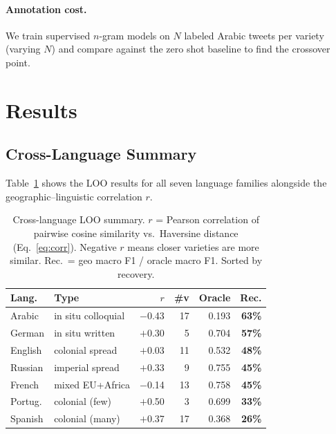 \documentclass[11pt]{article}
\begin{document}
\paragraph{Annotation cost.}
We train supervised $n$-gram models on $N$ labeled Arabic tweets per variety (varying $N$) and compare against the zero shot baseline to find the crossover point.

\section{Results}
\label{sec:results}

\subsection{Cross-Language Summary}
\label{sec:summary}

Table~\ref{tab:summary} shows the LOO results for all seven language families alongside the geographic--linguistic correlation $r$.

\begin{table}[t]
\centering
\footnotesize
\setlength{\tabcolsep}{3pt}
\begin{tabular}{l p{2.1cm} r r r r}
\toprule
\textbf{Lang.} & \textbf{Type} & $r$ &
  \textbf{\#v} & \textbf{Oracle} & \textbf{Rec.} \\
\midrule
Arabic    & in situ colloquial  & $-$0.43 & 17 & 0.193 & \textbf{63\%} \\
German    & in situ written     & $+$0.30 &  5 & 0.704 & \textbf{57\%} \\
English   & colonial spread     & $+$0.03 & 11 & 0.532 & \textbf{48\%} \\
Russian   & imperial spread     & $+$0.33 &  9 & 0.755 & \textbf{45\%} \\
French    & mixed EU+Africa     & $-$0.14 & 13 & 0.758 & \textbf{45\%} \\
Portug.   & colonial (few)      & $+$0.50 &  3 & 0.699 & \textbf{33\%} \\
Spanish   & colonial (many)     & $+$0.37 & 17 & 0.368 & \textbf{26\%} \\
\bottomrule
\end{tabular}
\caption{Cross-language LOO summary.
  $r$ = Pearson correlation of pairwise cosine similarity vs.\ Haversine distance (Eq.~\ref{eq:corr}).
  Negative $r$ means closer varieties are more similar.
  Rec.\ = geo macro F1 / oracle macro F1.
  Sorted by recovery.}
\label{tab:summary}
\end{table}
\end{document}
